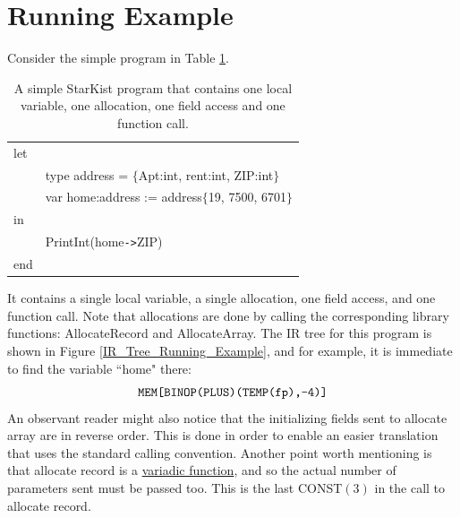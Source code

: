 \documentclass{article}
\begin{document}
\section{Running Example}
Consider the simple program in Table \ref{Table_StarKist_Program_Running_Example}.
\begin{table}[h]
\centering
\begin{tabular}{l l}
  let    &                                                   \\
         & type address = $\{$Apt:int, rent:int, ZIP:int$\}$ \\
         & var home:address := address$\{$19, 7500, 6701$\}$ \\
  in     &                                                   \\
         & PrintInt(home\verb"->"ZIP)                    \\
  end    &                                                   \\
\end{tabular}
\caption{
A simple StarKist program that contains one local variable,
one allocation, one field access and one function call.
\label{Table_StarKist_Program_Running_Example}}
\end{table}
It contains a single local variable, a single allocation,
one field access, and one function call.
Note that allocations are done by calling the corresponding
library functions: AllocateRecord and AllocateArray.
The IR tree for this program is shown in Figure \ref{IR_Tree_Running_Example},
and for example, it is immediate to find the variable ``home" there:
\[
\verb"MEM[BINOP(PLUS)(TEMP(fp),-4)]"
\]
An observant reader might also notice that the initializing
fields sent to allocate array are in reverse order.
This is done in order to enable an easier translation
that uses the standard calling convention.
Another point worth mentioning is that allocate record is a
\href{https://en.wikipedia.org/wiki/Variadic_function}{variadic function},
and so the actual number of parameters sent must be passed too.
This is the last CONST$(3)$ in the call to allocate record.
\end{document}
